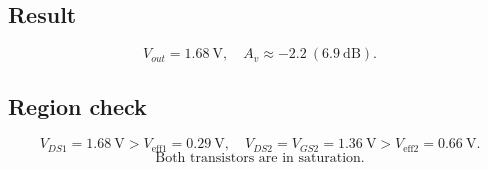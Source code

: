 \documentclass[main.tex]{subfiles}
\begin{document}
\subsection*{Result}
\[
\boxed{V_{out}=1.68~\text{V},\quad A_v\approx-2.2~(6.9~\text{dB}).}
\]
\subsection*{Region check}
\[
V_{DS1}=1.68~\text{V}>V_{\text{eff1}}=0.29~\text{V},\quad
V_{DS2}=V_{GS2}=1.36~\text{V}>V_{\text{eff2}}=0.66~\text{V}.
\]
\[
\boxed{\text{Both transistors are in saturation.}}
\]
\end{document}
